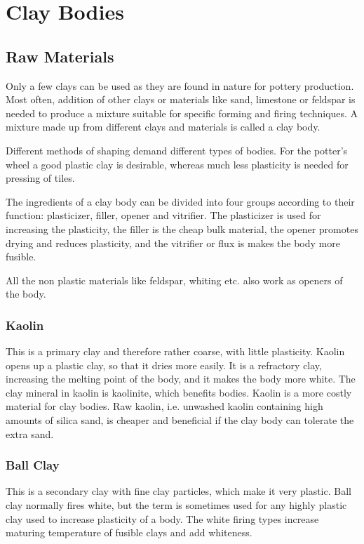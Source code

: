 \chapter{Clay Bodies}
\section{Raw Materials}
Only a few clays can be used as they are found in nature for pottery 
production. Most often, addition of other clays or materials like sand, 
limestone or feldspar is needed to produce a mixture suitable for specific 
forming and firing techniques. A mixture made up from different clays and 
materials is called a clay body.

Different methods of shaping demand different types of bodies. For the potter's 
wheel a good plastic clay is desirable, whereas much less plasticity is needed 
for pressing of tiles.

The ingredients of a clay body can be divided into four groups according to 
their function: plasticizer, filler, opener and vitrifier. The plasticizer is 
used for increasing the plasticity, the filler is the cheap bulk material, the 
opener promotes drying and reduces plasticity, and the vitrifier or flux is 
makes the body more fusible.

All the non plastic materials like feldspar, whiting etc. also work as openers 
of the body.
\subsection{Kaolin}
This is a primary clay and therefore rather coarse, with little plasticity. 
Kaolin opens up a plastic clay, so that it dries more easily. It is a 
refractory clay, increasing the melting point of the body, and it makes the 
body more white. The clay mineral in kaolin is kaolinite, which benefits 
bodies. Kaolin is a more costly material for clay bodies. Raw kaolin, i.e. 
unwashed kaolin containing high amounts of silica sand, is cheaper and 
beneficial if the clay body can tolerate the extra sand.
\subsection{Ball Clay}
This is a secondary clay with fine clay particles, which make it very plastic. 
Ball clay normally fires white, but the term is sometimes used for any highly 
plastic clay used to increase plasticity of a body. The white firing types 
increase maturing temperature of fusible clays and add whiteness. 

